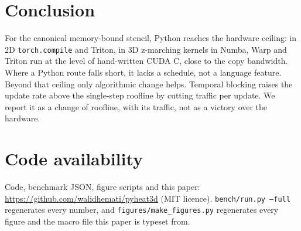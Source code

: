 \documentclass[11pt]{article}
\newcommand{\code}[1]{\texttt{#1}}
\begin{document}
\section{Conclusion}
For the canonical memory-bound stencil, Python reaches the hardware ceiling: in 2D
\code{torch.compile} and Triton, in 3D z-marching kernels in Numba, Warp and Triton run at the
level of hand-written CUDA C, close to the copy bandwidth. Where a Python route falls short, it
lacks a schedule, not a language feature. Beyond that ceiling only algorithmic change helps. Temporal blocking raises the update
rate above the single-step roofline by cutting traffic per update. We report it as a change of
roofline, with its traffic, not as a victory over the hardware.

\section*{Code availability}
Code, benchmark JSON, figure scripts and this paper:
\url{https://github.com/walidhemati/pyheat3d} (MIT licence). \code{bench/run.py --full}
regenerates every number, and \code{figures/make\_figures.py} regenerates every figure and the
macro file this paper is typeset from.



\end{document}
